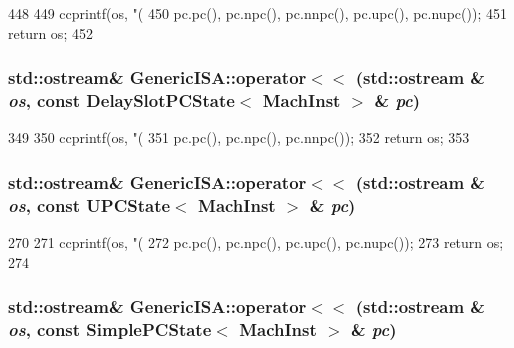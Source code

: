 \begin{DoxyCode}
448 {
449     ccprintf(os, "(%
450             pc.pc(), pc.npc(), pc.nnpc(), pc.upc(), pc.nupc());
451     return os;
452 }
\end{DoxyCode}
\hypertarget{namespaceGenericISA_a1ee53cba61e057cc025be65f71694001}{
\subsubsection[{operator$<$$<$}]{\setlength{\rightskip}{0pt plus 5cm}std::ostream\& GenericISA::operator$<$$<$ (std::ostream \& {\em os}, \/  const DelaySlotPCState$<$ MachInst $>$ \& {\em pc})}}
\label{namespaceGenericISA_a1ee53cba61e057cc025be65f71694001}



\begin{DoxyCode}
349 {
350     ccprintf(os, "(%
351             pc.pc(), pc.npc(), pc.nnpc());
352     return os;
353 }
\end{DoxyCode}
\hypertarget{namespaceGenericISA_ad7647a2fd4c0b3a52c3039868605af36}{
\subsubsection[{operator$<$$<$}]{\setlength{\rightskip}{0pt plus 5cm}std::ostream\& GenericISA::operator$<$$<$ (std::ostream \& {\em os}, \/  const UPCState$<$ MachInst $>$ \& {\em pc})}}
\label{namespaceGenericISA_ad7647a2fd4c0b3a52c3039868605af36}



\begin{DoxyCode}
270 {
271     ccprintf(os, "(%
272             pc.pc(), pc.npc(), pc.upc(), pc.nupc());
273     return os;
274 }
\end{DoxyCode}
\hypertarget{namespaceGenericISA_a960fce0270870fc775ac34cc401036ba}{
\subsubsection[{operator$<$$<$}]{\setlength{\rightskip}{0pt plus 5cm}std::ostream\& GenericISA::operator$<$$<$ (std::ostream \& {\em os}, \/  const SimplePCState$<$ MachInst $>$ \& {\em pc})}}
\label{namespaceGenericISA_a960fce0270870fc775ac34cc401036ba}



